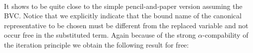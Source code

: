 \documentclass{entcs}
\newcommand{\alp}{\ensuremath{\alpha}}
\begin{document}
\begin{code}%
\> \AgdaSymbol{:}       \<%
\\
\>       \<%
\\
\> \AgdaSymbol{|}  \AgdaSymbol{\_} \AgdaSymbol{=} \<%
\\
\> \AgdaSymbol{|}  \<[10]%
\>[10]\AgdaSymbol{\_} \AgdaSymbol{=}  \<%
\\
\>\AgdaComment{--}\<%
\\
\>\AgdaFunction{\_[\_≔\_]} \AgdaSymbol{:}       \<%
\\
\> \AgdaFunction{[}    \AgdaFunction{]} \AgdaSymbol{=}   \AgdaSymbol{(}  \AgdaSymbol{)}  \AgdaSymbol{(}    \AgdaInductiveConstructor{,} \AgdaSymbol{)} \<%
\end{code}


It shows to be quite close to the simple pencil-and-paper version assuming the BVC. Notice that we explicitly indicate that the bound name of the canonical representative to be chosen must be different from the replaced variable and not occur free in the substituted term.
Again because of the strong \alp-compability of the iteration principle we obtain the following result for free:

\end{document}
